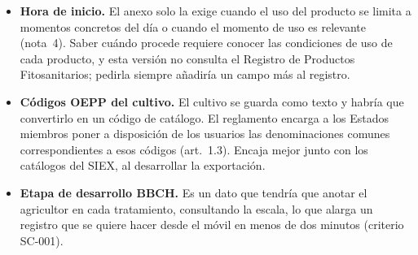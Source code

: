 \begin{itemize}
	\item \textbf{Hora de inicio.} El anexo solo la exige cuando el uso del producto se limita a momentos concretos del día o cuando el momento de uso es relevante (nota~4). Saber cuándo procede requiere conocer las condiciones de uso de cada producto, y esta versión no consulta el Registro de Productos Fitosanitarios; pedirla siempre añadiría un campo más al registro.
	\item \textbf{Códigos OEPP del cultivo.} El cultivo se guarda como texto y habría que convertirlo en un código de catálogo. El reglamento encarga a los Estados miembros poner a disposición de los usuarios las denominaciones comunes correspondientes a esos códigos (art.~1.3). Encaja mejor junto con los catálogos del SIEX, al desarrollar la exportación.
	\item \textbf{Etapa de desarrollo BBCH.} Es un dato que tendría que anotar el agricultor en cada tratamiento, consultando la escala, lo que alarga un registro que se quiere hacer desde el móvil en menos de dos minutos (criterio SC-001).
\end{itemize}
